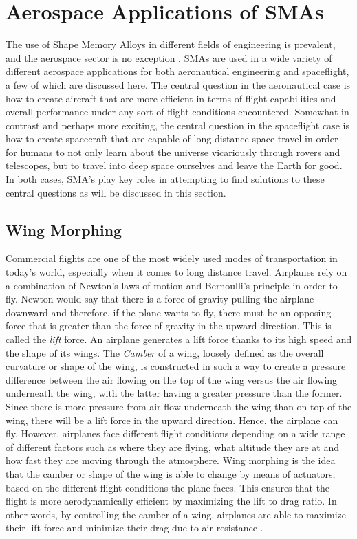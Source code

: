 \chapter{Aerospace Applications of SMAs}
\begin{multicols}{2}

The use of Shape Memory Alloys in different fields of engineering is prevalent, and the aerospace sector is no exception \cite{costanza2020shape}. SMAs are used in a wide variety of different aerospace applications for both aeronautical engineering and spaceflight, a few of which are discussed here. The central question in the aeronautical case is how to create aircraft that are more efficient in terms of flight capabilities and overall performance under any sort of flight conditions encountered. Somewhat in contrast and perhaps more exciting, the central question in the spaceflight case is how to create spacecraft that are capable of long distance space travel in order for humans to not only learn about the universe vicariously through rovers and telescopes, but to travel into deep space ourselves and leave the Earth for good. In both cases, SMA’s play key roles in attempting to find solutions to these central questions as will be discussed in this section.

\section{Wing Morphing}

Commercial flights are one of the most widely used modes of transportation in today’s world, especially when it comes to long distance travel. Airplanes rely on a combination of Newton’s laws of motion and Bernoulli’s principle in order to fly. Newton would say that there is a force of gravity pulling the airplane downward and therefore, if the plane wants to fly, there must be an opposing force that is greater than the force of gravity in the upward direction. This is called the \textit{lift} force. An airplane generates a lift force thanks to its high speed and the shape of its wings. The \textit{Camber} of a wing, loosely defined as the overall curvature or shape of the wing, is constructed in such a way to create a pressure difference between the air flowing on the top of the wing versus the air flowing underneath the wing, with the latter having a greater pressure than the former. Since there is more pressure from air flow underneath the wing than on top of the wing, there will be a lift force in the upward direction. Hence, the airplane can fly. However, airplanes face different flight conditions depending on a wide range of different factors such as where they are flying, what altitude they are at and how fast they are moving through the atmosphere. Wing morphing is the idea that the camber or shape of the wing is able to change by means of actuators, based on the different flight conditions the plane faces. This ensures that the flight is more aerodynamically efficient by maximizing the lift to drag ratio. In other words, by controlling the camber of a wing, airplanes are able to maximize their lift force and minimize their drag due to air resistance \cite{barbarino2011review}.


\end{multicols}
